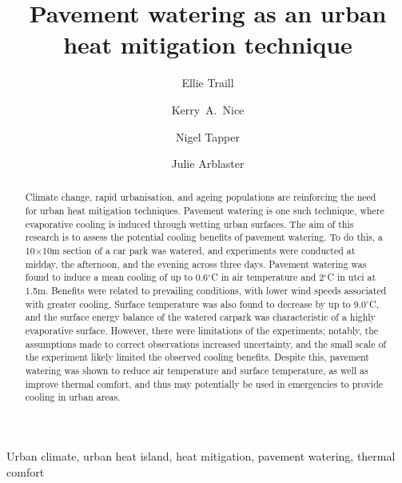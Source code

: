 \documentclass[final,3p,times,authoryear]{elsarticle}
\begin{document}
\title{Pavement watering as an urban heat mitigation technique}

\author[monash]{Ellie Traill}
\author[melb]{Kerry~A.~Nice}

\author[monash]{Nigel Tapper}
\author[monash]{Julie Arblaster}

\address[melb]{Transport, Health, and Urban Design Research Lab, Faculty of Architecture, Building, and Planning, University of Melbourne, VIC, Australia.}
\address[monash]{School of Earth, Atmosphere and Environment, Monash University, Clayton, VIC 3800, Australia.}




\begin{abstract}

Climate change, rapid urbanisation, and ageing populations are reinforcing the need for urban heat mitigation techniques. Pavement watering is one such technique, where evaporative cooling is induced through wetting urban surfaces. The aim of this research is to assess the potential cooling benefits of pavement watering. To do this, a 10$\times$10m section of a car park was watered, and experiments were conducted at midday, the afternoon, and the evening across three days. Pavement watering was found to induce a mean cooling of up to 0.6$^{\circ}$C in air temperature and 2$^{\circ}$C in \gls{utci} at 1.5m. Benefits were related to prevailing conditions, with lower wind speeds associated with greater cooling. Surface temperature was also found to decrease by up to 9.0$^{\circ}$C, and the surface energy balance of the watered carpark was characteristic of a highly evaporative surface. However, there were limitations of the experiments; notably, the assumptions made to correct observations increased uncertainty, and the small scale of the experiment likely limited the observed cooling benefits. Despite this, pavement watering was shown to reduce air temperature and surface temperature, as well as improve thermal comfort, and thus may potentially be used in emergencies to provide cooling in urban areas.

\end{abstract}

\begin{keyword}
Urban climate\sep
urban heat island\sep 
heat mitigation\sep 
pavement watering\sep 
thermal comfort
\end{keyword}
\end{document}
